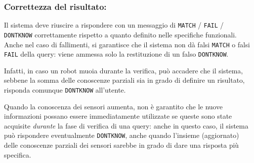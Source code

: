 \subsubsection*{Correttezza del risultato:}
Il sistema deve riuscire a rispondere con un messaggio di
\texttt{MATCH} / \texttt{FAIL} / \texttt{DONTKNOW} correttamente
rispetto a quanto definito nelle specifiche funzionali.
Anche nel caso di fallimenti, si garantisce che
il sistema non dà falsi \texttt{MATCH} o falsi \texttt{FAIL} della query:
viene ammessa solo la restituzione di un falso \texttt{DONTKNOW}.

Infatti,
in caso un robot muoia durante la verifica, può accadere che il sistema,
sebbene la somma delle conoscenze parziali sia in grado di definire
un risultato, risponda comunque \texttt{DONTKNOW} all'utente.

Quando la conoscenza dei sensori aumenta,
non è garantito che le nuove informazioni possano essere immediatamente
utilizzate se queste sono state acquisite \emph{durante} la fase di verifica
di una query: anche in questo caso, il sistema può rispondere eventualmente
\texttt{DONTKNOW}, anche quando l'insieme (aggiornato) delle conoscenze
parziali dei sensori sarebbe in grado di dare una risposta più specifica.

